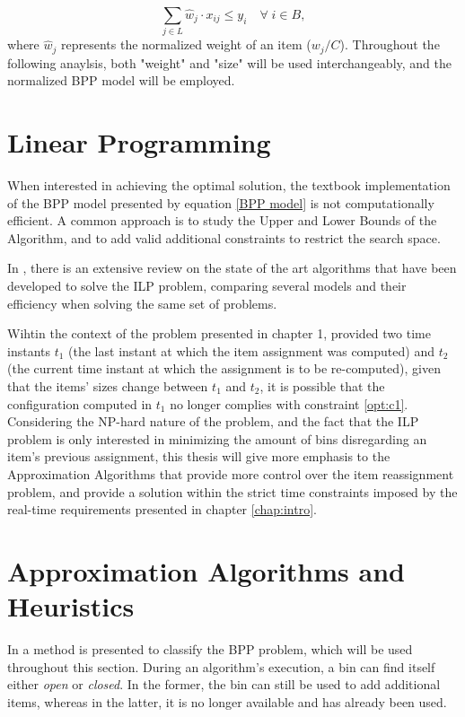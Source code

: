 \begin{equation}
    \sum_{j \in L} \hat w_j \cdot x_{ij} \leq y_i \quad \forall \; i \in B,
\end{equation}
where \(\hat w_j\) represents the normalized weight of an item ($w_j/C$).
Throughout the following anaylsis, both "weight" and "size" will be used
interchangeably, and the normalized BPP model will be employed.

\section{Linear Programming}

When interested in achieving the optimal solution, the textbook implementation
of the BPP model presented by equation \ref{BPP model} is not computationally
efficient. A common approach is to study the Upper and Lower Bounds of the
Algorithm, and to add valid additional constraints to restrict the search space.

In \cite{delorme2016bin}, there is an extensive review on the state of the art
algorithms that have been developed to solve the ILP problem, comparing several
models and their efficiency when solving the same set of problems. 

Wihtin the context of the problem presented in chapter 1, provided two time
instants $t_1$ (the last instant at which the item assignment was computed) and
$t_2$ (the current time instant at which the assignment is to be re-computed),
given that the items' sizes change between $t_1$ and $t_2$, it is possible that
the configuration computed in $t_1$ no longer complies with constraint
\ref{opt:c1}. Considering the NP-hard nature of the problem, and the fact that the
ILP problem is only interested in minimizing the amount of bins disregarding an
item's previous assignment, this thesis will give more emphasis to the
Approximation Algorithms that provide more control over the item reassignment
problem, and provide a solution within the strict time constraints imposed by
the real-time requirements presented in chapter \ref{chap:intro}.

\section{Approximation Algorithms and Heuristics}
\label{section:AA}

In \cite{coffman2013bin} a method is presented to classify the BPP problem,
which will be used throughout this section. During an algorithm's execution,
a bin can find itself either \textit{open} or \textit{closed}. In the former,
the bin can still be used to add additional items, whereas in the latter, it is
no longer available and has already been used.  

